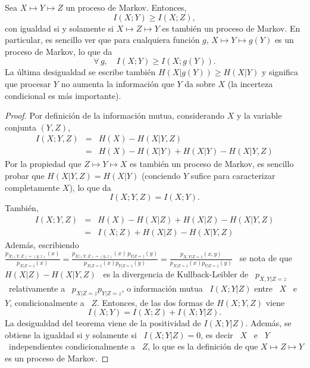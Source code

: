 \begin{teorema}
\label{Teo:SZ:DesigualdadPreocesamientoDatos}
%
  Sea  $X \mapsto  Y \mapsto  Z$ un  proceso de  Markov. Entonces,
  \[
  I(X;Y) \ge I(X;Z),
  \]
  con igualdad si y solamente si $X \mapsto Z \mapsto Y$ es tambi\'en un proceso
  de Markov. En  particular, es sencillo ver que  para cualquiera funci\'on $g$,
  $X \mapsto Y \mapsto g(Y)$ es un proceso de Markov, lo que da
  \[
  \forall \, g, \quad I(X;Y) \ge I(X;g(Y)).
  \]
  La  \'ultima  desigualdad  se  escribe  tambi\'en  $H(X|g(Y))  \ge  H(X|Y)$  y
  significa que  procesar $Y$ no aumenta  la informaci\'on que $Y$  da sobre $X$
  (la incerteza condicional es m\'as importante).
\end{teorema}
%
\begin{proof}
  Por definici\'on  de la  informaci\'on mutua, considerando  $X$ y  la variable
  conjunta $(Y,Z)$,
  \begin{eqnarray*}
  I(X ; Y,Z) & = & H(X) - H(X|Y,Z)\\[2.5mm]
  & = & H(X) - H(X|Y) + H(X|Y) - H(X|Y,Z)
  \end{eqnarray*}
  \noindent Por la propiedad que $Z \mapsto Y \mapsto X$ es tambi\'en un proceso
  de Markov,  es sencillo probar que  $H(X|Y,Z) = H(X|Y)$  (conciendo $Y$ sufice
  para caracterizar completamente $X$), lo que da
  \[
  I(X;Y,Z) = I(X;Y).
  \]
  Tambi\'en,
  \begin{eqnarray*}
  I(X ; Y,Z) & = & H(X) - H(X|Z) + H(X|Z) - H(X|Y,Z)\\[2.5mm]
  & = & I(X;Z) + H(X|Z) - H(X|Y,Z)
  \end{eqnarray*}
  \noindent Adem\'as, escribiendo \ $\frac{p_{X|(Y,Z)=(y,z)}(x)}{p_{X|Z=z}(x)} =
  \frac{p_{X|(Y,Z)=(y,z)}(x)   \,  p_{Y|Z=z}(y)}{p_{X|Z=z}(x)   p_{Y|Z=z}(y)}  =
  \frac{p_{X,Y|Z=z}(x,y)}{p_{X|Z=z}(x) p_{Y|Z=z}(y)}$ \ se nota de que \ $H(X|Z)
  -  H(X|Y,Z)$ \  es la  divergencia de  Kullback-Leibler de  \  $p_{X,Y|Z=z}$ \
  relativamente a  \ $p_{X|Z=z} p_{Y|Z=z}$,  o informaci\'on mutua  \ $I(X;Y|Z)$
  entre \ $X$ \ e \ $Y$,  condicionalmente a \ $Z$.  Entonces, de las dos formas
  de $H(X;Y,Z)$ viene
  \[
  I(X;Y) = I(X;Z) + I(X;Y|Z).
  \]
  La desigualdad del teorema viene de la positividad de $I(X;Y|Z)$. Adem\'as, se
  obtiene la igualdad si  y solamente si \ $I(X;Y|Z) = 0$, es decir  \ $X$ \ e \
  $Y$ \  independientes condicionalmente a \  $Z$, lo que es  la definici\'on de
  que $X \mapsto Z \mapsto Y$ es un proceso de Markov.
\end{proof}


